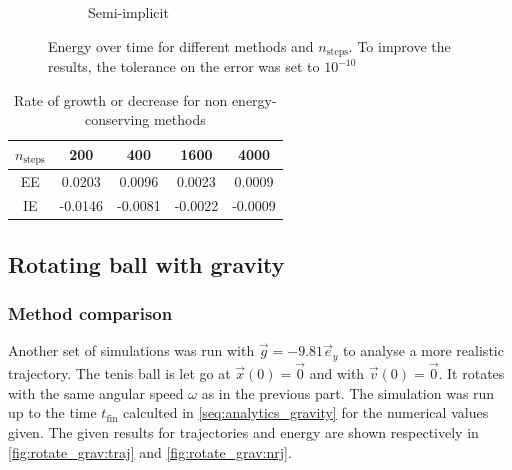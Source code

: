 \begin{figure}[h]
\begin{subfigure}{0.5\linewidth}
        \caption{Semi-implicit}
    \end{subfigure}
    \caption{Energy over time for different methods and $n_\textrm{steps}$. To improve the results, the tolerance on the error was set to $10^{-10}$}
    \label{fig:nograv:energy}
\end{figure}

\begin{table}[h]
    \centering
    \begin{tabulary}{0.8\linewidth}{C|C|C|C|C}
        \toprule
        $n_\textrm{steps}$ & 200 & 400 & 1600 & 4000 \\
        \midrule
        EE & 0.0203 & 0.0096 & 0.0023 & 0.0009 \\
        IE & -0.0146 & -0.0081 & -0.0022 & -0.0009 \\
        \bottomrule
    \end{tabulary}
    \caption{Rate of growth or decrease for non energy-conserving methods}
    \label{tab:nograv:rate}
\end{table}

\subsection{Rotating ball with gravity}

\subsubsection{Method comparison}
\label{seq:gravrot:comp}

Another set of simulations was run with $\vec{g} = -9.81 \vec{e}_y$ to analyse a more realistic trajectory. The tenis ball is let go at $\vec{x}(0) = \vec{0}$ and with $\vec{v}(0) = \vec{0}$. It rotates with the same angular speed $\omega$ as in the previous part. The simulation was run up to the time $t_\mathrm{fin}$ calculted in \autoref{seq:analytics_gravity} for the numerical values given. The given results for trajectories and energy are shown respectively in \autoref{fig:rotate_grav:traj} and \autoref{fig:rotate_grav:nrj}.


